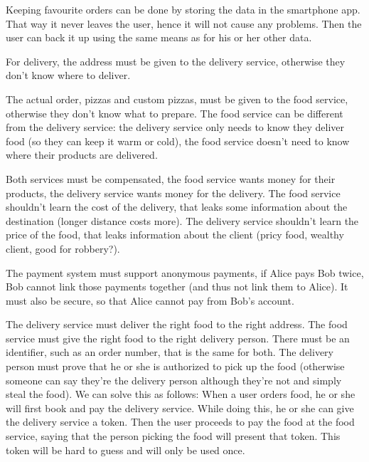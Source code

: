 \begin{solution}
  Keeping favourite orders \etc can be done by storing the data in the 
  smartphone app.
  That way it never leaves the user, hence it will not cause any problems.
  Then the user can back it up using the same means as for his or her other 
  data.

  For delivery, the address must be given to the delivery service, otherwise 
  they don't know where to deliver.

  The actual order, \eg pizzas and custom pizzas, must be given to the food 
  service, otherwise they don't know what to prepare.
  The food service can be different from the delivery service: the delivery 
  service only needs to know they deliver food (so they can keep it warm or 
  cold), the food service doesn't need to know where their products are 
  delivered.

  Both services must be compensated, the food service wants money for their 
  products, the delivery service wants money for the delivery.
  The food service shouldn't learn the cost of the delivery, that leaks some 
  information about the destination (\eg longer distance costs more).
  The delivery service shouldn't learn the price of the food, that leaks 
  information about the client (pricy food, wealthy client, good for robbery?).

  The payment system must support anonymous payments, \ie if Alice pays Bob 
  twice, Bob cannot link those payments together (and thus not link them to 
  Alice).
  It must also be secure, so that Alice cannot pay from Bob's account.

  The delivery service must deliver the right food to the right address.
  The food service must give the right food to the right delivery person.
  There must be an identifier, such as an order number, that is the same for 
  both.
  The delivery person must prove that he or she is authorized to pick up the 
  food (otherwise someone can say they're the delivery person although they're 
  not and simply steal the food).
  We can solve this as follows:
  When a user orders food, he or she will first book and pay the delivery 
  service.
  While doing this, he or she can give the delivery service a token.
  Then the user proceeds to pay the food at the food service, saying that the 
  person picking the food will present that token.
  This token will be hard to guess and will only be used once.
\end{solution}

